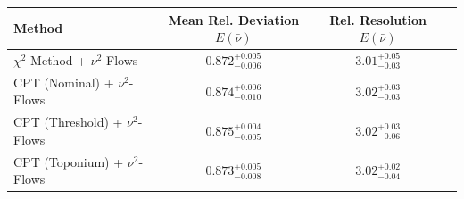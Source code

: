     \begin{tabular}{lccc}
        \toprule
        Method & Mean Rel. Deviation $E(\bar{\nu})$ & Rel. Resolution $E(\bar{\nu})$ \\
        \midrule
        $\chi^2$-Method + $\nu^2$-Flows & $0.872^{+0.005}_{-0.006}$ & $3.01^{+0.05}_{-0.03}$ \\
        CPT (Nominal) + $\nu^2$-Flows & $0.874^{+0.006}_{-0.010}$ & $3.02^{+0.03}_{-0.03}$ \\
        CPT (Threshold) + $\nu^2$-Flows & $0.875^{+0.004}_{-0.005}$ & $3.02^{+0.03}_{-0.06}$ \\
        CPT (Toponium) + $\nu^2$-Flows & $0.873^{+0.005}_{-0.008}$ & $3.02^{+0.02}_{-0.04}$ \\
        \bottomrule
    \end{tabular}